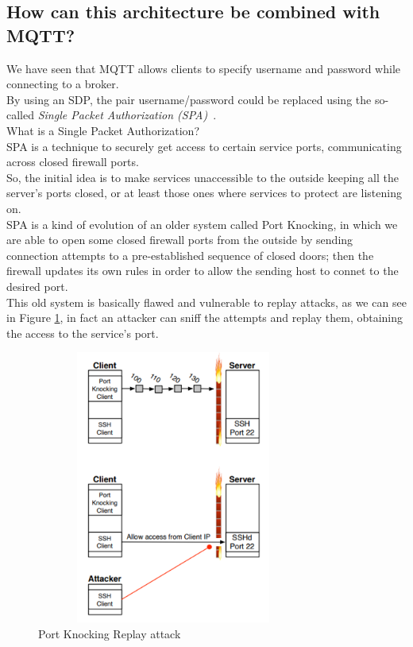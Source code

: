 \documentclass[12pt]{report}
\begin{document}
{{\subsection{How can this architecture be combined with MQTT?}
\bigskip

We have seen that MQTT allows clients to specify username and password while connecting to a broker.\\By using an SDP, the pair username/password could be replaced using the so-called \emph{Single Packet Authorization (SPA)}~\cite{mqttonlywithsdp}.\\

What is a Single Packet Authorization?~\cite{portknockandspaanalysis}\\

SPA is a technique to securely get access to certain service ports, communicating across closed firewall ports.\\
So, the initial idea is to make services unaccessible to the outside keeping all the server's ports closed, or at least those ones where services to protect are listening on.\\

SPA is a kind of evolution of an older system called Port Knocking, in which we are able to  open some closed firewall ports from the outside by sending connection attempts to a pre-established sequence of closed doors; then the firewall updates its own rules in order to allow the sending host to connet to the desired port.\\
This old system is basically flawed and vulnerable to replay attacks, as we can see in Figure \ref{fig:portknocking}, in fact an attacker can sniff the attempts and replay them, obtaining the access to the service's port.\\

\begin{figure}[H]
\includegraphics[width=9cm,height=9cm,keepaspectratio]{port_knocking}
\centering
\caption{Port Knocking Replay attack}
\label{fig:portknocking}
\end{figure}

}}
\end{document}
